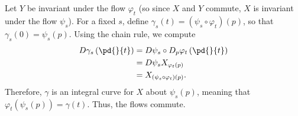 \documentclass[10pt]{mypackage}
\begin{document}
\begin{solution}
\begin{enumerate}[(a)]
      Let $Y$ be invariant under the flow $\varphi_t$ (so since $X$ and $Y$ commute, $X$ is invariant under the flow $\psi_s$). For a fixed $s$, define $\gamma_s(t) = \left( \psi_s\circ \varphi_t \right)(p)$, so that $\gamma_s(0) = \psi_s(p)$. Using the chain rule, we compute
      \begin{align*}
        D\gamma_s\left( \pd{}{t} \right) &= D\psi_s\circ D_p\varphi_t\left( \pd{}{t} \right)\\
                                         &= D\psi_s X_{\varphi_t(p)}\\
                                         &= X_{\left( \psi_s\circ \varphi_t \right)(p)}.
      \end{align*}
      Therefore, $\gamma$ is an integral curve for $X$ about $\psi_s(p)$, meaning that $\varphi_t\left( \psi_s(p) \right) = \gamma(t)$. Thus, the flows commute.\newline


\end{enumerate}
\end{solution}
\end{document}
